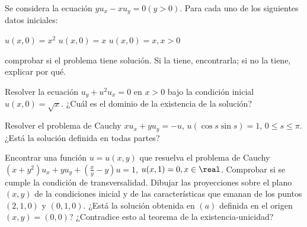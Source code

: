 \begin{problem}[9]
	Se considera la ecuación $yu_x - xu_y = 0 (y > 0)$. Para cada uno de los siguientes datos iniciales:

	\ppart $u(x,0) = x^2$
	\ppart $u(x,0) = x$
	\ppart $u(x,0) = x, x > 0$

	comprobar si el problema tiene solución. Si la tiene, encontrarla; si no la tiene, explicar por qué.

	\solution

\end{problem}











\begin{problem}[10]
	Resolver la ecuación $u_y + u^2 u_x = 0$ en $x > 0$ bajo la condición inicial $u(x,0) = \sqrt{x}$. ¿Cuál es el dominio de la existencia de la solución?

	\solution
\end{problem}













\begin{problem}[11]
	Resolver el problema de Cauchy $xu_x + yu_y = -u$, $ u(\cos s \sin s) = 1$, $ 0 \leq s \leq \pi$. ¿Está la solución definida en todas partes?

	\solution
\end{problem}








\begin{problem}[12]
	\ppart Encontrar una función $u = u(x,y)$ que resuelva el problema de Cauchy $(x + y^2)u_x + yu_y + (\frac{x}{y} - y) u = 1$, $u(x,1) = 0, x \in \real$.
	\ppart Comprobar si se cumple la condición de transversalidad.
	\ppart Dibujar las proyecciones sobre el plano $(x,y)$ de la condiciones inicial y de las características que emanan de los puntos $(2,1,0)$ y $(0,1,0)$.
	\ppart ¿Está la solución obtenida en $(a)$ definida en el origen $(x,y) = (0,0)$? ¿Contradice esto al teorema de la existencia-unicidad?

	\solution


\end{problem}


